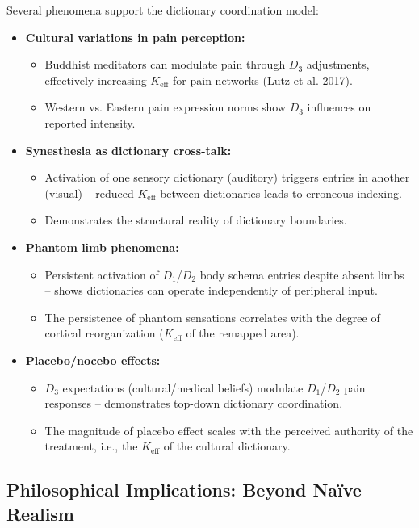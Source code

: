 \documentclass[12pt,a4paper]{article}
\newcommand{\eff}{\mathrm{eff}}
\newcommand{\Ke}{K_{\eff}}
\begin{document}
	Several phenomena support the dictionary coordination model:
	
	\begin{itemize}
		\item \textbf{Cultural variations in pain perception:}
		\begin{itemize}
			\item Buddhist meditators can modulate pain through $D_3$ adjustments, effectively increasing $\Ke$ for pain networks (Lutz et al. 2017).
			\item Western vs. Eastern pain expression norms show $D_3$ influences on reported intensity.
		\end{itemize}
		
		\item \textbf{Synesthesia as dictionary cross-talk:}
		\begin{itemize}
			\item Activation of one sensory dictionary (auditory) triggers entries in another (visual) – reduced $\Ke$ between dictionaries leads to erroneous indexing.
			\item Demonstrates the structural reality of dictionary boundaries.
		\end{itemize}
		
		\item \textbf{Phantom limb phenomena:}
		\begin{itemize}
			\item Persistent activation of $D_1$/$D_2$ body schema entries despite absent limbs – shows dictionaries can operate independently of peripheral input.
			\item The persistence of phantom sensations correlates with the degree of cortical reorganization ($\Ke$ of the remapped area).
		\end{itemize}
		
		\item \textbf{Placebo/nocebo effects:}
		\begin{itemize}
			\item $D_3$ expectations (cultural/medical beliefs) modulate $D_1$/$D_2$ pain responses – demonstrates top-down dictionary coordination.
			\item The magnitude of placebo effect scales with the perceived authority of the treatment, i.e., the $\Ke$ of the cultural dictionary.
		\end{itemize}
	\end{itemize}
	
	\subsection{Philosophical Implications: Beyond Naïve Realism}
	
\end{document}
